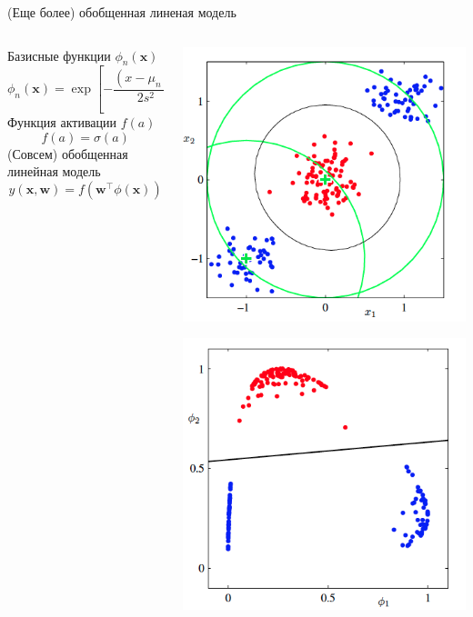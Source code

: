 \documentclass[10pt,a4paper]{beamer}
\begin{document}
\begin{frame}{(Еще более) обобщенная линеная модель}

\begin{columns}[T]
    \begin{column}{.5\textwidth}
    \vspace{2em}
	Базисные функции $\phi_n(\mathbf{x})$
\[
\phi_n(\mathbf{x}) = \exp\left[ -\frac{(x - \mu_n)^2}{2 s^2}\right]
\]
Функция активации $f(a)$
\[
f(a) = \sigma(a)
\]
(Совсем) обобщенная линейная модель
\[
y(\mathbf{x}, \mathbf{w}) = f(\mathbf{w}^\top \phi(\mathbf{x}))
\]

    \end{column}
       
    \begin{column}{.5\textwidth}
    \vspace{-2em}
	\begin{center}
   		\includegraphics[scale=0.25]{images/nl.png}
   		
   		\includegraphics[scale=0.25]{images/l.png}
    \end{center}
    \end{column}
  \end{columns}


\end{frame}
\end{document}

